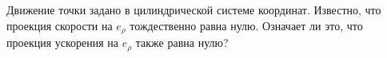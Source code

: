 Движение точки задано в цилиндрической системе координат. Известно,
что проекция скорости на $e_{\rho}$ тождественно равна нулю.
Означает ли это, что проекция ускорения на $e_{\rho}$ также равна нулю?

